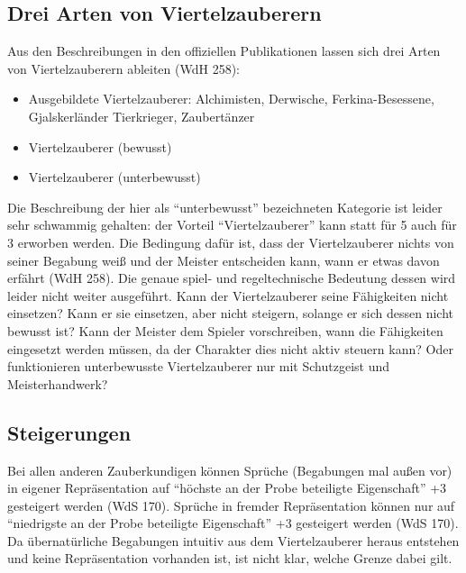\subsection{Drei Arten von Viertelzauberern}
Aus den Beschreibungen in den offiziellen Publikationen lassen sich drei Arten von Viertelzauberern ableiten (WdH 258):
\begin{itemize}
	\item Ausgebildete Viertelzauberer: Alchimisten, Derwische, Ferkina-Besessene, Gjalskerländer Tierkrieger, Zaubertänzer
	\item Viertelzauberer (bewusst)
	\item Viertelzauberer (unterbewusst)
\end{itemize}
Die Beschreibung der hier als \enquote{unterbewusst} bezeichneten Kategorie ist leider sehr schwammig gehalten: der Vorteil \enquote{Viertelzauberer} kann statt für \SI{5}{\GP} auch für \SI{3}{\GP} erworben werden. Die Bedingung dafür ist, dass der Viertelzauberer nichts von seiner Begabung weiß und der Meister entscheiden kann, wann er etwas davon erfährt (WdH 258). Die genaue spiel- und regeltechnische Bedeutung dessen wird leider nicht weiter ausgeführt. Kann der Viertelzauberer seine Fähigkeiten nicht einsetzen? Kann er sie einsetzen, aber nicht steigern, solange er sich dessen nicht bewusst ist? Kann der Meister dem Spieler vorschreiben, wann die Fähigkeiten eingesetzt werden müssen, da der Charakter dies nicht aktiv steuern kann? Oder funktionieren unterbewusste Viertelzauberer nur mit Schutzgeist und Meisterhandwerk?

\subsection{Steigerungen}
Bei allen anderen Zauberkundigen können Sprüche (Begabungen mal außen vor) in eigener Repräsentation auf \enquote{höchste an der Probe beteiligte Eigenschaft} +3 gesteigert werden (WdS 170). Sprüche in fremder Repräsentation können nur auf \enquote{niedrigste an der Probe beteiligte Eigenschaft} +3 gesteigert werden (WdS 170). Da übernatürliche Begabungen intuitiv aus dem Viertelzauberer heraus entstehen und keine Repräsentation vorhanden ist, ist nicht klar, welche Grenze dabei gilt.

